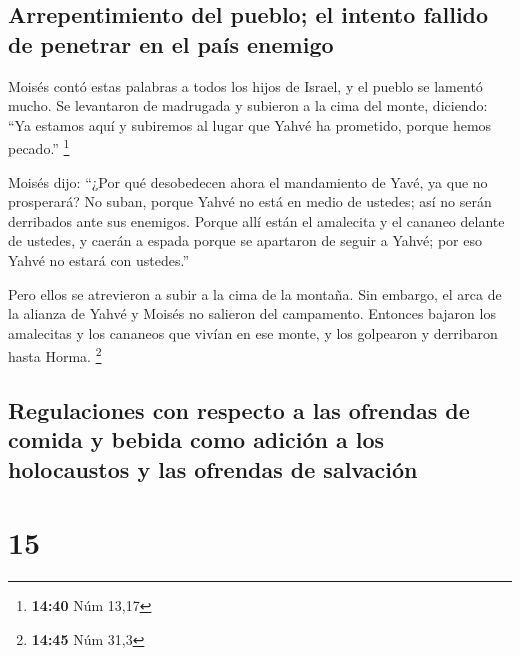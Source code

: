\hypertarget{arrepentimiento-del-pueblo-el-intento-fallido-de-penetrar-en-el-pauxeds-enemigo}{%
\subsection{Arrepentimiento del pueblo; el intento fallido de penetrar
en el país
enemigo}\label{arrepentimiento-del-pueblo-el-intento-fallido-de-penetrar-en-el-pauxeds-enemigo}}

 Moisés contó estas palabras a todos los hijos de Israel,
y el pueblo se lamentó mucho.  Se levantaron de madrugada
y subieron a la cima del monte, diciendo: ``Ya estamos aquí y subiremos
al lugar que Yahvé ha prometido, porque hemos pecado.'' \footnote{\textbf{14:40}
  Núm 13,17}

 Moisés dijo: ``¿Por qué desobedecen ahora el mandamiento
de Yavé, ya que no prosperará?  No suban, porque Yahvé no
está en medio de ustedes; así no serán derribados ante sus enemigos.
 Porque allí están el amalecita y el cananeo delante de
ustedes, y caerán a espada porque se apartaron de seguir a Yahvé; por
eso Yahvé no estará con ustedes.''

 Pero ellos se atrevieron a subir a la cima de la
montaña. Sin embargo, el arca de la alianza de Yahvé y Moisés no
salieron del campamento.  Entonces bajaron los amalecitas
y los cananeos que vivían en ese monte, y los golpearon y derribaron
hasta Horma. \footnote{\textbf{14:45} Núm 31,3}

\hypertarget{regulaciones-con-respecto-a-las-ofrendas-de-comida-y-bebida-como-adiciuxf3n-a-los-holocaustos-y-las-ofrendas-de-salvaciuxf3n}{%
\subsection{Regulaciones con respecto a las ofrendas de comida y bebida
como adición a los holocaustos y las ofrendas de
salvación}\label{regulaciones-con-respecto-a-las-ofrendas-de-comida-y-bebida-como-adiciuxf3n-a-los-holocaustos-y-las-ofrendas-de-salvaciuxf3n}}

\hypertarget{section-14}{%
\section{15}\label{section-14}}

